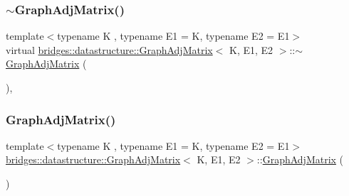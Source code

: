 \subsubsection{\texorpdfstring{$\sim$\+Graph\+Adj\+Matrix()}{~GraphAdjMatrix()}}
{\footnotesize\ttfamily template$<$typename K , typename E1  = K, typename E2  = E1$>$ \\
virtual \hyperlink{classbridges_1_1datastructure_1_1_graph_adj_matrix}{bridges\+::datastructure\+::\+Graph\+Adj\+Matrix}$<$ K, E1, E2 $>$\+::$\sim$\hyperlink{classbridges_1_1datastructure_1_1_graph_adj_matrix}{Graph\+Adj\+Matrix} (\begin{DoxyParamCaption}{ }\end{DoxyParamCaption})\hspace{0.3cm}{\ttfamily [inline]}, {\ttfamily [virtual]}}

\mbox{\label{classbridges_1_1datastructure_1_1_graph_adj_matrix_a43d51f3dcb175767b28555494eb3aee1}} 
\subsubsection{\texorpdfstring{Graph\+Adj\+Matrix()}{GraphAdjMatrix()}\hspace{0.1cm}{\footnotesize\ttfamily [1/2]}}
{\footnotesize\ttfamily template$<$typename K , typename E1  = K, typename E2  = E1$>$ \\
\hyperlink{classbridges_1_1datastructure_1_1_graph_adj_matrix}{bridges\+::datastructure\+::\+Graph\+Adj\+Matrix}$<$ K, E1, E2 $>$\+::\hyperlink{classbridges_1_1datastructure_1_1_graph_adj_matrix}{Graph\+Adj\+Matrix} (\begin{DoxyParamCaption}{ }\end{DoxyParamCaption})\hspace{0.3cm}{\ttfamily [default]}}

\mbox{\label{classbridges_1_1datastructure_1_1_graph_adj_matrix_a08f3ae1748d5eeb88fa2d99c8427e534}} 
